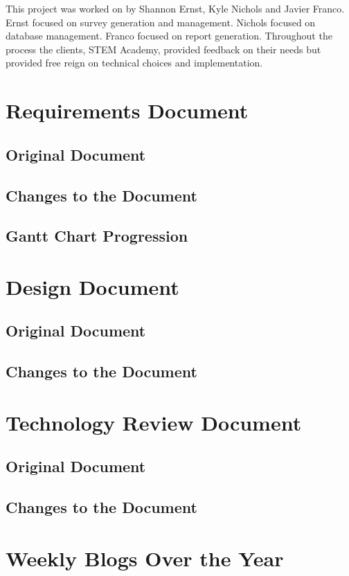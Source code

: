 \documentclass[letterpaper,10pt,serif,draftclsnofoot,onecolumn,compsoc,titlepage]{IEEEtran}
\begin{document}
This project was worked on by Shannon Ernst, Kyle Nichols and Javier Franco.
Ernst focused on survey generation and management. 
Nichols focused on database management.
Franco focused on report generation.
Throughout the process the clients, STEM Academy, provided feedback on their needs but provided free reign on technical choices and implementation. 

\section{Requirements Document}
\subsection{Original Document}
%
%
\subsection{Changes to the Document}
\subsection{Gantt Chart Progression}

\section{Design Document}
\subsection{Original Document}
\subsection{Changes to the Document}

\section{Technology Review Document}
\subsection{Original Document}
\subsection{Changes to the Document}

\section{Weekly Blogs Over the Year}



\end{document}
